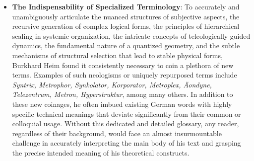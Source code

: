 \documentclass[
    12pt,              %
    a4paper,           %
    headings=normal,   %
    twoside=true,      %
    BCOR=8mm,          %
]{scrbook}
\begin{document}
\begin{itemize}
    \item \textbf{The Indispensability of Specialized Terminology}:
    To accurately and unambiguously articulate the nuanced structures of subjective aspects, the recursive generation of complex logical forms, the principles of hierarchical scaling in systemic organization, the intricate concepts of teleologically guided dynamics, the fundamental nature of a quantized geometry, and the subtle mechanisms of structural selection that lead to stable physical forms, Burkhard Heim found it consistently necessary to coin a plethora of new terms. Examples of such neologisms or uniquely repurposed terms include \textit{Syntrix, Metrophor, Synkolator, Korporator, Metroplex, Äondyne, Telezentrum, Metron, Hyperstruktur}, among many others. In addition to these new coinages, he often imbued existing German words with highly specific technical meanings that deviate significantly from their common or colloquial usage. Without this dedicated and detailed glossary, any reader, regardless of their background, would face an almost insurmountable challenge in accurately interpreting the main body of his text and grasping the precise intended meaning of his theoretical constructs.


\end{itemize}
\end{document}
